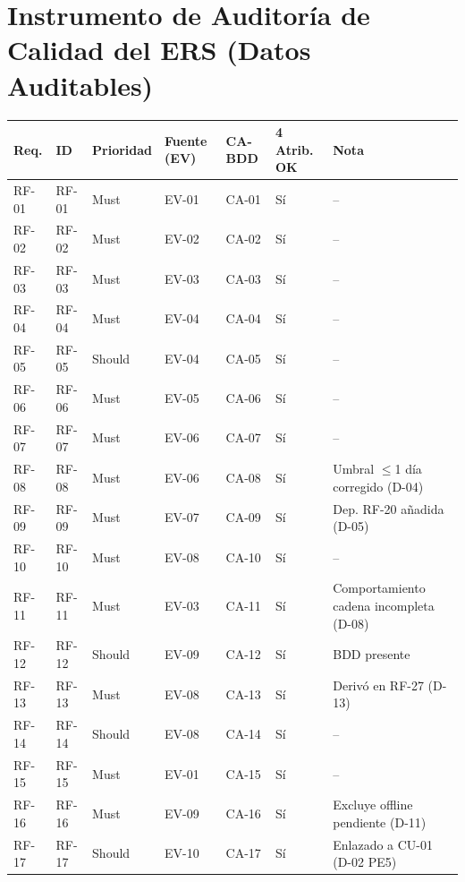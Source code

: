 \documentclass[11pt,a4paper]{article}
\begin{document}
\newpage



\appendix

\section{Instrumento de Auditoría de Calidad del ERS (Datos Auditables)}
\label{anx:auditoria}

\begin{longtable}{|p{1.2cm}|p{2cm}|p{1.5cm}|p{1.5cm}|p{1.5cm}|p{1.5cm}|p{3cm}|}
\hline
\textbf{Req.} & \textbf{ID} & \textbf{Prioridad} & \textbf{Fuente (EV)} & \textbf{CA-BDD} & \textbf{4 Atrib. OK} & \textbf{Nota} \\
\hline
RF-01 & RF-01 & Must & EV-01 & CA-01 & Sí & -- \\
RF-02 & RF-02 & Must & EV-02 & CA-02 & Sí & -- \\
RF-03 & RF-03 & Must & EV-03 & CA-03 & Sí & -- \\
RF-04 & RF-04 & Must & EV-04 & CA-04 & Sí & -- \\
RF-05 & RF-05 & Should & EV-04 & CA-05 & Sí & -- \\
RF-06 & RF-06 & Must & EV-05 & CA-06 & Sí & -- \\
RF-07 & RF-07 & Must & EV-06 & CA-07 & Sí & -- \\
RF-08 & RF-08 & Must & EV-06 & CA-08 & Sí & Umbral $\leq$1 día corregido (D-04) \\
RF-09 & RF-09 & Must & EV-07 & CA-09 & Sí & Dep. RF-20 añadida (D-05) \\
RF-10 & RF-10 & Must & EV-08 & CA-10 & Sí & -- \\
RF-11 & RF-11 & Must & EV-03 & CA-11 & Sí & Comportamiento cadena incompleta (D-08) \\
RF-12 & RF-12 & Should & EV-09 & CA-12 & Sí & BDD presente \\
RF-13 & RF-13 & Must & EV-08 & CA-13 & Sí & Derivó en RF-27 (D-13) \\
RF-14 & RF-14 & Should & EV-08 & CA-14 & Sí & -- \\
RF-15 & RF-15 & Must & EV-01 & CA-15 & Sí & -- \\
RF-16 & RF-16 & Must & EV-09 & CA-16 & Sí & Excluye offline pendiente (D-11) \\
RF-17 & RF-17 & Should & EV-10 & CA-17 & Sí & Enlazado a CU-01 (D-02 PE5) \\

\end{longtable}
\end{document}

